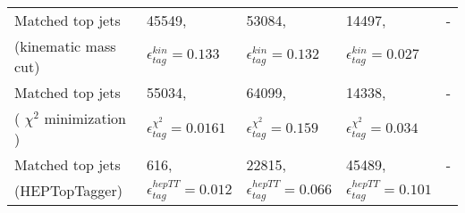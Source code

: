 \documentclass[12pt,a4paper]{article}		%
\begin{document}
\begin{table}[h!]
\begin{tabular}{ |p{5cm}|p{3cm}|p{3cm}|p{3cm}|p{3cm}| }
	\hline
	Matched top jets        & 45549, & 53084, & 14497, & - \\
	(kinematic mass cut)  & $\epsilon_{tag}^{kin} = 0.133$ & $\epsilon_{tag}^{kin} = 0.132$ & $\epsilon_{tag}^{kin} = 0.027$ &  \\
	\hline
	Matched top jets       & 55034, & 64099, & 14338, & - \\
	( $\chi^2$ minimization )  & $\epsilon_{tag}^{\chi^2} = 0.0161$ & $\epsilon_{tag}^{\chi^2} = 0.159$ & $\epsilon_{tag}^{\chi^2} = 0.034$ &  \\
	\hline
	Matched top jets       & 616, & 22815, & 45489, & - \\
	(HEPTopTagger)  & $\epsilon_{tag}^{hepTT} = 0.012$ & $\epsilon_{tag}^{hepTT} = 0.066$ & $\epsilon_{tag}^{hepTT} = 0.101$ &  \\
	\hline
\end{tabular}
	\label{toprecotable}
\end{table}
  
\newpage
\end{document}
